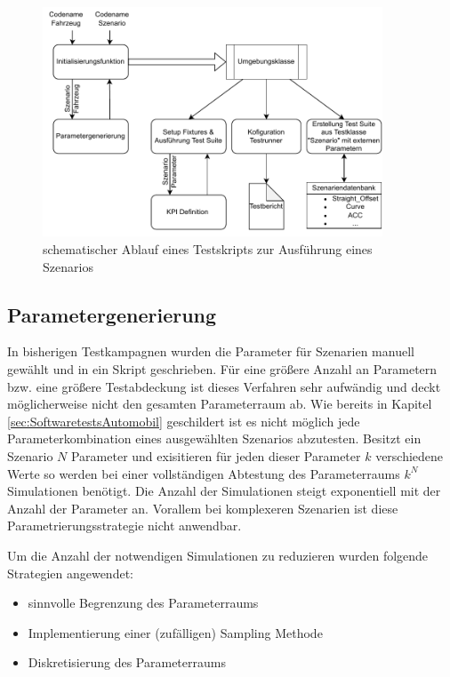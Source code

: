 \begin{figure}
    \centering
    \includegraphics[width=0.9\textwidth]{figures/3_Implementierung/Ablauf_TestSkript.drawio.pdf}
    \caption{schematischer Ablauf eines Testskripts zur Ausführung eines Szenarios}
    \label{fig:Testskript_Ablauf}
\end{figure}

\subsection{Parametergenerierung} \label{subsec:Parametergenerierung}
In bisherigen Testkampagnen wurden die Parameter für Szenarien manuell gewählt und in ein Skript geschrieben. Für eine größere Anzahl an Parametern bzw. eine größere Testabdeckung ist dieses Verfahren sehr aufwändig und deckt möglicherweise nicht den gesamten Parameterraum ab. Wie bereits in Kapitel \ref{sec:SoftwaretestsAutomobil} geschildert ist es nicht möglich jede Parameterkombination eines ausgewählten Szenarios abzutesten. Besitzt ein Szenario $N$ Parameter und exisitieren für jeden dieser Parameter $k$ verschiedene Werte so werden bei einer vollständigen Abtestung des Parameterraums $k^{N}$ Simulationen benötigt. Die Anzahl der Simulationen steigt exponentiell mit der Anzahl der Parameter an. Vorallem bei komplexeren Szenarien ist diese Parametrierungsstrategie nicht anwendbar.

Um die Anzahl der notwendigen Simulationen zu reduzieren wurden folgende Strategien angewendet:
\begin{itemize}
    \item sinnvolle Begrenzung des Parameterraums
    \item Implementierung einer (zufälligen) Sampling Methode
    \item Diskretisierung des Parameterraums
\end{itemize}

